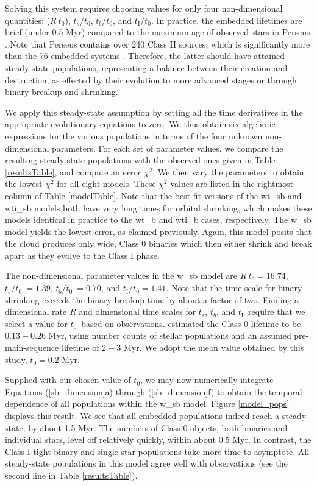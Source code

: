 \documentclass[usenatbib,a4paper]{mnras}
\newcommand{\tOI}{\mbox{$t_{0}$}} %
\newcommand{\tI}{\mbox{$t_\textrm{I}$}}%
\begin{document}
\noindent Solving this system requires choosing values for only four non-dimensional quantities: ($R\ \tOI$), $t_s/\tOI$, $t_b/\tOI$, and \tI/\tOI.  In practice, the embedded lifetimes are brief (under 0.5 Myr) compared to the maximum age of observed stars in Perseus \citep[2 to 3 Myr;][]{Bally08}.  Note that Perseus contains over 240 Class II sources, which is significantly more than the 76 embedded systems \citep{Dunham15}.   Therefore, the latter should have attained steady-state populations, representing a balance between their creation and destruction, as effected by their evolution to more advanced stages or through binary breakup and shrinking. 

We apply this steady-state assumption by setting all the time derivatives in the appropriate evolutionary equations to zero.  We thus obtain six algebraic expressions for the various populations in terms of the four unknown non-dimensional parameters.  For each set of parameter values, we compare the resulting steady-state populations with the observed ones given in Table \ref{resultsTable}, and compute an error $\chi^2$.  We then vary the parameters to obtain the lowest $\chi^2$ for all eight models.  These $\chi^2$ values are listed in the rightmost column of Table \ref{modelTable}.   Note that the best-fit versions of the wt\_sb and wti\_sb models both have very long times for orbital shrinking, which makes these models identical in practice to the wt\_b and wti\_b cases, respectively.  The w\_sb model yields the lowest error, as claimed previously.   Again, this model posits that the cloud produces only wide, Class 0 binaries which then either shrink and break apart as they evolve to the Class I phase.

The non-dimensional parameter values in the w\_sb model are $R\ \tOI = 16.74$, $t_s/\tOI\ = 1.39$, $t_b/\tOI\ = 0.70$, and $\tI/\tOI = 1.41$.  Note that the time scale for binary shrinking exceeds the binary breakup time by about a factor of two.  Finding a dimensional rate $R$ and dimensional time scales for $t_s$, $t_b$, and \tI\ require that we select a value for \tOI\  based on observations.  \citet{Dunham15} estimated the Class 0 lifetime to be $0.13-0.26$ Myr, using number counts of stellar populations and an assumed pre-main-sequence lifetime of $2-3$ Myr.  We adopt the mean value obtained by this study, $\tOI = 0.2$ Myr. 

Supplied with our chosen value of $\tOI$, we may now numerically integrate Equations (\ref{sb_dimension}a) through (\ref{sb_dimension}f) to obtain the temporal dependence of all populations within the w\_sb model.  Figure \ref{model_pops} displays this result.  We see that all  embedded populations indeed reach a steady state, by about 1.5 Myr.  The numbers of Class 0 objects, both binaries and individual stars, level off relatively quickly, within about 0.5 Myr.   In contrast, the Class I tight binary and single star populations take more time to asymptote.   All steady-state populations in this model agree well with observations (see the second line in Table \ref{resultsTable}). 
\end{document}
